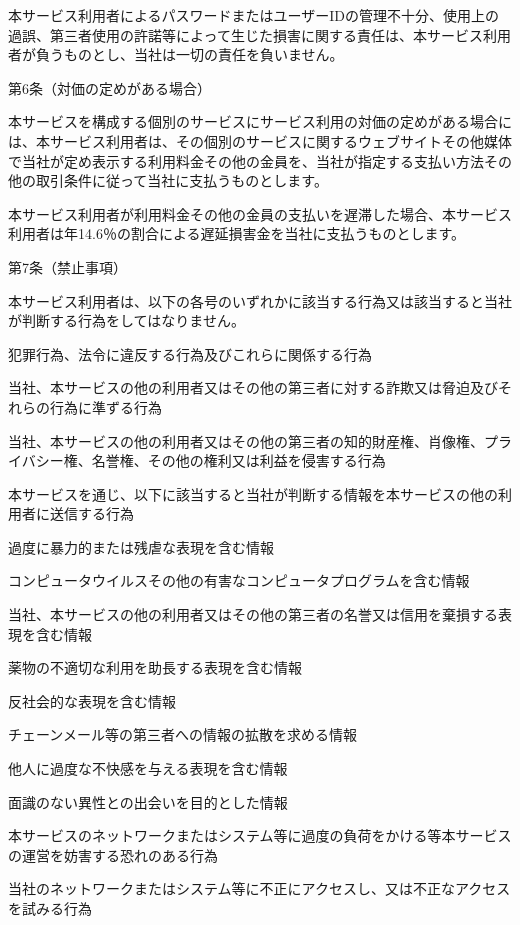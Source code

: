     本サービス利用者によるパスワードまたはユーザーIDの管理不十分、使用上の過誤、第三者使用の許諾等によって生じた損害に関する責任は、本サービス利用者が負うものとし、当社は一切の責任を負いません。

第6条（対価の定めがある場合）

    本サービスを構成する個別のサービスにサービス利用の対価の定めがある場合には、本サービス利用者は、その個別のサービスに関するウェブサイトその他媒体で当社が定め表示する利用料金その他の金員を、当社が指定する支払い方法その他の取引条件に従って当社に支払うものとします。

    本サービス利用者が利用料金その他の金員の支払いを遅滞した場合、本サービス利用者は年14.6％の割合による遅延損害金を当社に支払うものとします。

第7条（禁止事項）

本サービス利用者は、以下の各号のいずれかに該当する行為又は該当すると当社が判断する行為をしてはなりません。

    犯罪行為、法令に違反する行為及びこれらに関係する行為

    当社、本サービスの他の利用者又はその他の第三者に対する詐欺又は脅迫及びそれらの行為に準ずる行為

    当社、本サービスの他の利用者又はその他の第三者の知的財産権、肖像権、プライバシー権、名誉権、その他の権利又は利益を侵害する行為

        本サービスを通じ、以下に該当すると当社が判断する情報を本サービスの他の利用者に送信する行為

        過度に暴力的または残虐な表現を含む情報

        コンピュータウイルスその他の有害なコンピュータプログラムを含む情報

        当社、本サービスの他の利用者又はその他の第三者の名誉又は信用を棄損する表現を含む情報

        薬物の不適切な利用を助長する表現を含む情報

        反社会的な表現を含む情報

        チェーンメール等の第三者への情報の拡散を求める情報

        他人に過度な不快感を与える表現を含む情報

        面識のない異性との出会いを目的とした情報

    本サービスのネットワークまたはシステム等に過度の負荷をかける等本サービスの運営を妨害する恐れのある行為

    当社のネットワークまたはシステム等に不正にアクセスし、又は不正なアクセスを試みる行為

